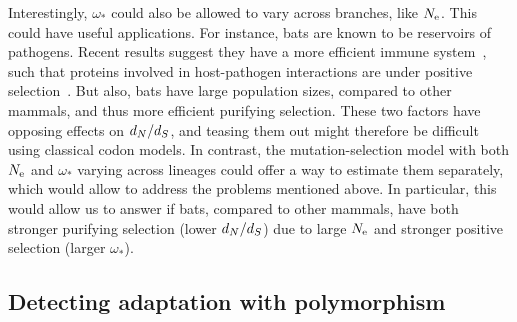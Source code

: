 Interestingly, $\omega_*$ could also be allowed to vary across branches, like $N_{\text{e}}$.
This could have useful applications.
For instance, bats are known to be reservoirs of pathogens.
Recent results suggest they have a more efficient immune system~\citep{Baker2013,Pavlovich2018}, such that proteins involved in host-pathogen interactions are under positive selection~\citep{Hawkins2019,Vandewege2020}.
But also, bats have large population sizes, compared to other mammals, and thus more efficient purifying selection.
These two factors have opposing effects on $d_N / d_S$, and teasing them out might therefore be difficult using classical codon models.
In contrast, the mutation-selection model with both $N_{\text{e}}$ and $\omega_*$ varying across lineages could offer a way to estimate them separately, which would allow to address the problems mentioned above.
In particular, this would allow us to answer if bats, compared to other mammals, have both stronger purifying selection (lower $d_N / d_S$) due to large $N_{\text{e}}$ and stronger positive selection (larger $\omega_*$).

\subsection{Detecting adaptation with polymorphism}
\label{subsec:detecting-adaptation-with-polymorphism}

